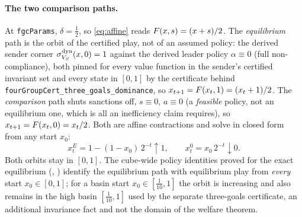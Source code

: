 \paragraph{The two comparison paths.}
At \texttt{fgcParams}, $\delta=\tfrac12$, so \eqref{eq:affine} reads
$F(x,s)=(x+s)/2$. The \emph{equilibrium} path is the orbit of the
certified play, not of an assumed policy: the derived sender corner
$\sigma^{\mathrm{dyn}}_{V_S}(x,0)=1$ against the derived leader policy
$\alpha\equiv 0$ (full non-compliance), both pinned for every value function in
the sender's certified invariant set and every state in $[0,1]$ by the certificate
behind \texttt{fourGroupCert\_three\_goals\_dominance}, so
$x_{t+1}=F(x_t,1)=(x_t+1)/2$. The \emph{comparison} path shuts sanctions
off, $s\equiv0$, $a\equiv0$ (a \emph{feasible} policy, not an
equilibrium one, which is all an inefficiency claim requires), so
$x_{t+1}=F(x_t,0)=x_t/2$. Both are affine contractions and solve in
closed form from any start $x_0$:
\begin{equation}
x^E_t=1-(1-x_0)\,2^{-t}\uparrow 1,
\qquad
x^0_t=x_0\,2^{-t}\downarrow 0 .
\label{eq:planner-paths}
\end{equation}
Both orbits stay in $[0,1]$. The cube-wide policy identities proved for the
exact equilibrium (,
) identify the equilibrium path with
equilibrium play from \emph{every} start $x_0\in[0,1]$; for a basin start
$x_0\in[\tfrac1{10},1]$ the orbit is increasing and also remains in the high
basin $[\tfrac1{10},1]$ used by the separate three-goals certificate, an
additional invariance fact and not the domain of the welfare theorem.

